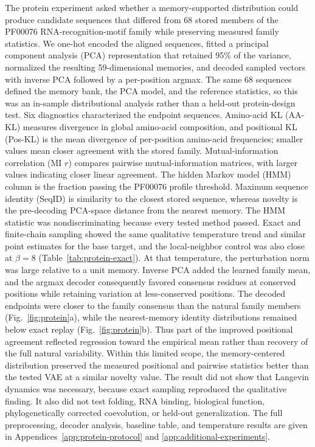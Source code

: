 The protein experiment asked whether a memory-supported distribution could
produce candidate sequences that differed from 68 stored members of the
PF00076 RNA-recognition-motif family while preserving measured family
statistics. We one-hot encoded the aligned sequences, fitted a principal
component analysis (PCA) representation that retained 95\% of the variance,
normalized the resulting 59-dimensional memories, and decoded sampled vectors
with inverse PCA followed by a per-position argmax. The same 68 sequences
defined the memory bank, the PCA model, and the reference statistics, so this
was an in-sample distributional analysis rather than a held-out protein-design
test.
Six diagnostics characterized the endpoint sequences. Amino-acid KL (AA-KL)
measures divergence in global amino-acid composition, and positional KL
(Pos-KL) is the mean divergence of per-position amino-acid frequencies;
smaller values mean closer agreement with the stored family. Mutual-information
correlation (MI $r$) compares pairwise mutual-information matrices, with larger
values indicating closer linear agreement. The hidden Markov model (HMM) column
is the fraction passing the PF00076 profile threshold. Maximum sequence identity
(SeqID) is similarity to the closest stored sequence, whereas novelty is the
pre-decoding PCA-space distance from the nearest memory. The HMM statistic was
nondiscriminating because every tested method passed. Exact and finite-chain
sampling showed the same qualitative temperature trend and similar point
estimates for the base target, and the local-neighbor control was also close at
$\beta=8$ (Table~\ref{tab:protein-exact}). At that temperature, the perturbation
norm was large relative to a unit memory. Inverse PCA added the learned family
mean, and the argmax decoder
consequently favored consensus residues at conserved positions while retaining
variation at less-conserved positions. The decoded endpoints were closer to the
family consensus than the natural family members (Fig.~\ref{fig:protein}a),
while the nearest-memory identity distributions remained below exact replay
(Fig.~\ref{fig:protein}b). Thus part of the improved positional agreement
reflected regression toward the empirical mean rather than recovery of the full
natural variability. Within this limited scope, the memory-centered
distribution preserved the measured positional and pairwise statistics better
than the tested VAE at a similar novelty value. The result did not show that
Langevin dynamics was necessary, because exact sampling reproduced the
qualitative finding. It also did not test folding, RNA binding, biological
function, phylogenetically corrected coevolution, or held-out generalization.
The full preprocessing, decoder analysis, baseline table, and temperature
results are given in Appendices~\ref{app:protein-protocol} and
\ref{app:additional-experiments}.

